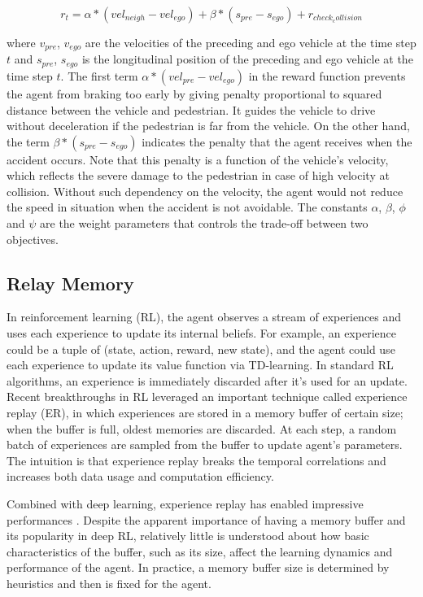 \begin{equation} \label{eq:reward-func}
r_t = \alpha * (vel_{neigh} - vel_{ego}) + \beta *  (s_{pre} - s_{ego}) + r_{check_collision}
\end{equation}

where $v_{pre}$, $v_{ego}$ are the velocities of the preceding and ego vehicle at the time step $t$ and $s_{pre}$, $s_{ego}$  is the longitudinal position of the preceding and ego vehicle at the time step $t$. The first term $ \alpha * (vel_{pre} - vel_{ego}) $ in the reward function prevents the agent from braking too early by giving penalty proportional to squared distance between the vehicle and pedestrian. It guides the vehicle to drive without deceleration if the pedestrian is far from the vehicle. On the other hand, the term $\beta *  (s_{pre} - s_{ego})$ indicates the penalty that the agent receives when the accident occurs. Note that this penalty is a function of the vehicle's velocity, which reflects the severe damage to the pedestrian in case of high velocity at collision. Without such dependency on the velocity, the agent would not reduce the speed in situation when the accident is not avoidable. The constants $\alpha$, $\beta$, $\phi$ and $\psi$ are the weight parameters that controls the trade-off between two objectives.

\subsection{Relay Memory}

In reinforcement learning (RL), the agent observes a stream of experiences and uses each experience to update its internal beliefs. For example, an experience could be a tuple of (state, action, reward, new state), and the agent could use each experience to update its value function via TD-learning. In standard RL algorithms, an experience is immediately discarded after it's used for an update. Recent breakthroughs in RL leveraged an important technique called experience replay (ER), in which experiences are stored in a memory buffer of certain size; when the buffer is full, oldest memories are discarded. At each step, a random batch of experiences are sampled from the buffer to update agent's parameters. The intuition is that experience replay breaks the temporal correlations and increases both data usage and computation efficiency.

Combined with deep learning, experience replay has enabled impressive performances \cite{Mnih2015AtariNature}. Despite the apparent importance of having a memory buffer and its popularity in deep RL, relatively little is understood about how basic characteristics of the buffer, such as its size, affect the learning dynamics and performance of the agent. In practice, a memory buffer size is determined by heuristics and then is fixed for the agent.

